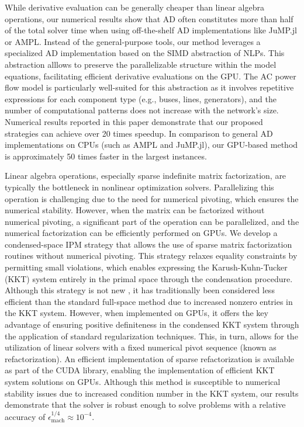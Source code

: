 While derivative evaluation can be generally cheaper than linear
algebra operations, our numerical results show that AD often
constitutes more than half of the total solver time when using
off-the-shelf AD implementations like JuMP.jl or AMPL. Instead of the
general-purpose tools, our method leverages a specialized AD
implementation based on the SIMD abstraction of NLPs. This abstraction
alllows to preserve the parallelizable structure within the model
equations, facilitating efficient derivative evaluations on the
GPU. The AC power flow model is particularly well-suited for this
abstraction as it involves repetitive expressions for each component
type (e.g., buses, lines, generators), and the number of computational
patterns does not increase with the network's size. Numerical results
reported in this paper demonstrate that our proposed strategies can
achieve over 20 times speedup. In comparison to general AD implementations
on CPUs (such as AMPL and JuMP.jl), our GPU-based method is
approximately 50 times faster in the largest instances.

Linear algebra operations, especially sparse indefinite matrix
factorization, are typically the bottleneck in nonlinear optimization
solvers. Parallelizing this operation is challenging due to the need
for numerical pivoting, which ensures the numerical
stability. However, when the matrix can be factorized without
numerical pivoting, a significant part of the operation can be
parallelized, and the numerical factorization can be efficiently
performed on GPUs. We develop a condensed-space IPM strategy that
allows the use of sparse matrix factorization routines without
numerical pivoting. This strategy relaxes equality constraints by
permitting small violations, which enables expressing the
Karush-Kuhn-Tucker (KKT) system entirely in the primal space
through the condensation procedure. Although this strategy is not new
\cite{nocedal2006numerical}, it has traditionally been considered less
efficient than the standard full-space method due to increased nonzero
entries in the KKT system. However, when implemented on GPUs, it
offers the key advantage of ensuring positive definiteness in the
condensed KKT system through the application of standard
regularization techniques. This, in turn, allows for the utilization
of linear solvers with a fixed numerical pivot sequence (known as
refactorization). An efficient implementation of sparse
refactorization is available as part of the CUDA library, enabling the
implementation of efficient KKT system solutions on GPUs. Although
this method is susceptible to numerical stability issues due to
increased condition number in the KKT system, our results demonstrate
that the solver is robust enough to solve problems with a relative
accuracy of $\epsilon_{\text{mach}}^{1/4}\approx 10^{-4}$.

